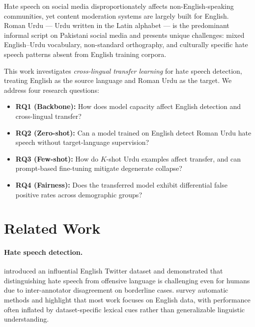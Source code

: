 \documentclass{article}
\begin{document}
Hate speech on social media disproportionately affects non-English-speaking
communities, yet content moderation systems are largely built for English.
Roman Urdu --- Urdu written in the Latin alphabet --- is the predominant informal
script on Pakistani social media and presents unique challenges: mixed
English--Urdu vocabulary, non-standard orthography, and culturally specific
hate speech patterns absent from English training corpora.

This work investigates \textit{cross-lingual transfer learning} for hate speech
detection, treating English as the source language and Roman Urdu as the target.
We address four research questions:

\begin{itemize}[leftmargin=*,nosep]
  \item \textbf{RQ1 (Backbone):} How does model capacity affect English detection
        and cross-lingual transfer?
  \item \textbf{RQ2 (Zero-shot):} Can a model trained on English detect Roman Urdu
        hate speech without target-language supervision?
  \item \textbf{RQ3 (Few-shot):} How do $K$-shot Urdu examples affect transfer,
        and can prompt-based fine-tuning mitigate degenerate collapse?
  \item \textbf{RQ4 (Fairness):} Does the transferred model exhibit differential
        false positive rates across demographic groups?
\end{itemize}

\section{Related Work}
\label{sec:related}

\paragraph{Hate speech detection.}
\citet{davidson2017automated} introduced an influential English Twitter dataset and
demonstrated that distinguishing hate speech from offensive language is challenging
even for humans due to inter-annotator disagreement on borderline cases.
\citet{fortuna2018survey} survey automatic methods and highlight that most work
focuses on English data, with performance often inflated by dataset-specific
lexical cues rather than generalizable linguistic understanding.
\end{document}
